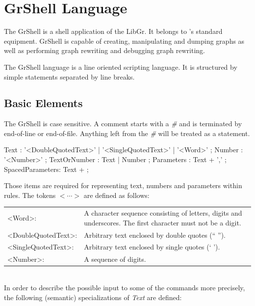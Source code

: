 \chapter{GrShell Language}

The GrShell is a shell application of the LibGr. It belongs to \GrG's standard equipment. GrShell is capable of creating, manipulating and dumping graphs as well as performing graph rewriting and debugging graph rewriting.

The GrShell language is a line oriented scripting language. It is structured by simple statements separated by line breaks.

\section{Basic Elements}

The GrShell is case sensitive. A comment starts with a \emph{\#} and is terminated by end-of-line or end-of-file. Anything left from the \emph{\#} will be treated as a statement.

\begin{rail} 
 Text : '<DoubleQuotedText>' | '<SingleQuotedText>' | '<Word>' ;
 Number : '<Number>' ;
 TextOrNumber : Text | Number ;
 Parameters : Text + ',' ;
 SpacedParameters: Text + ; 
\end{rail}

Those items are required for representing text, numbers and parameters within rules. The tokens $<\cdots>$ are defined as follows:\\

\begin{tabularx}{\linewidth}{lX}
<Word>: & A character sequence consisting of letters, digits and underscores. The first character must not be a digit.\\
<DoubleQuotedText>: & Arbitrary text enclosed by double quotes (`` '').\\
<SingleQuotedText>: & Arbitrary text enclosed by single quotes (` ').\\
<Number>: & A sequence of digits.
\end{tabularx}\\

In order to describe the possible input to some of the commands more precisely, the following (semantic) specializations of \emph{Text} are defined:\\

